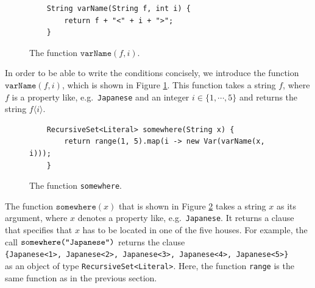 \begin{figure}[!ht]
\centering
\begin{verbatim}
    String varName(String f, int i) {
        return f + "<" + i + ">";
    }
\end{verbatim}
\vspace*{-0.3cm}
\caption{The function $\texttt{varName}(f, i)$.}
\label{fig:var_f_i}
\end{figure}

In order to be able to write the conditions concisely, we introduce the function
$\texttt{varName}(f, i)$, which is shown in Figure \ref{fig:var_f_i}.  This function
takes a string $f$, where $f$ is a property like, e.g.~\texttt{Japanese} and an
integer $i \in \{1,\cdots,5\}$ and returns the string $f\langle i\rangle$.




\begin{figure}[!ht]
\centering
\begin{verbatim}
    RecursiveSet<Literal> somewhere(String x) {
        return range(1, 5).map(i -> new Var(varName(x, i)));
    }
\end{verbatim}
\vspace*{-0.3cm}
\caption{The function \texttt{somewhere}.}
\label{fig:somewhere}
\end{figure}
The function $\texttt{somewhere}(x)$ that is shown in Figure \ref{fig:somewhere}
takes a string $x$ as its argument, where $x$ denotes a property like,
e.g.~\texttt{Japanese}.  It returns a clause that specifies that $x$ has to be
located in one of the five houses.  For example,  the call
$\texttt{somewhere(\symbol{34}Japanese\symbol{34})}$ returns the clause
\\[0.2cm]
\hspace*{1.3cm}
\texttt{\{Japanese<1>, Japanese<2>, Japanese<3>, Japanese<4>, Japanese<5>\}}
\\[0.2cm]
as an object of type \texttt{RecursiveSet<Literal>}.  Here, the function \texttt{range} is the same function as
in the previous section.


